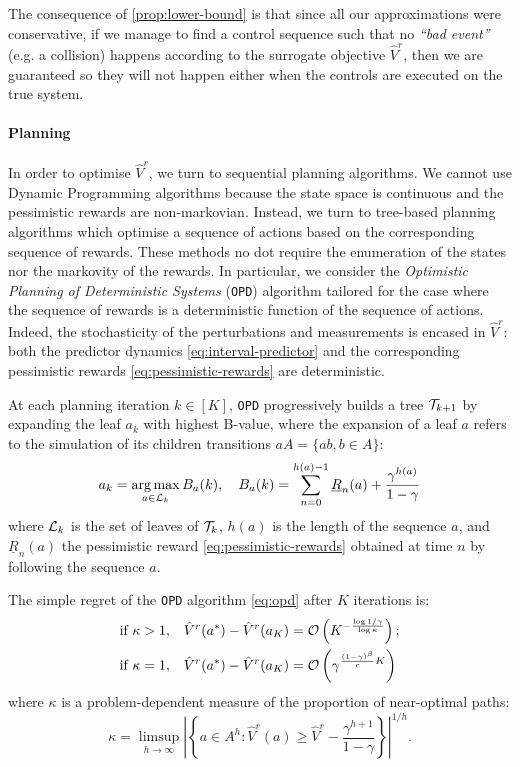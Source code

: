\documentclass{article}
\begin{document}
The consequence of \autoref{prop:lower-bound} is that since all our approximations were conservative, if we manage to find a control sequence such that no \textit{``bad event''} (e.g. a collision) happens according to the surrogate objective $\hat{V}^r$, then we are guaranteed so they will not happen either when the controls are executed on the true system. 

\paragraph{Planning}
In order to optimise $\hat{V}^r$, we turn to sequential planning algorithms. We cannot use Dynamic Programming algorithms because the state space is continuous and the pessimistic rewards are non-markovian. Instead, we turn to tree-based planning algorithms which optimise a sequence of actions based on the corresponding sequence of rewards. These methods no dot require the enumeration of the states nor the markovity of the rewards. In particular, we consider the \emph{Optimistic Planning of Deterministic Systems} (\texttt{OPD}) algorithm \citep{Hren2008} tailored for the case where the sequence of rewards is a deterministic function of the sequence of actions. Indeed, the stochasticity of the perturbations and measurements is encased in $\hat{V}^r$: both the predictor dynamics \eqref{eq:interval-predictor} and the corresponding pessimistic rewards \eqref{eq:pessimistic-rewards} are deterministic.

At each planning iteration $k\in[K]$, \texttt{OPD} progressively builds a tree $\mathcal{T}_{k+1}$ by expanding the leaf $a_k$ with highest B-value, where the expansion of a leaf $a$ refers to the simulation of its children transitions $aA = \{ab, b\in A\}$:
\begin{equation}
\label{eq:opd}
a_k = \operatorname*{arg\,max}_{a\in\mathcal{L}_k} B_a(k), \quad B_a(k) = \sum_{n=0}^{h(a)-1} \underline{R}_n(a) + \frac{\gamma^{h(a)}}{1-\gamma}
\end{equation}
where $\mathcal{L}_k$ is the set of leaves of $\mathcal{T}_k$, $h(a)$ is the length of the sequence $a$, and $\underline{R}_n(a)$ the pessimistic reward \eqref{eq:pessimistic-rewards} obtained at time $n$ by following the sequence $a$.
\begin{theorem}
\label{theorem:opd-regret}
The simple regret of the \texttt{OPD} algorithm \eqref{eq:opd} after $K$ iterations is:
\begin{align*}
\text{if } \kappa>1,\quad& 
\hat{V}^r(a^*) - \hat{V}^r({a_K}) = \mathcal{O}\left(K^{-\frac{\log 1/\gamma}{\log \kappa}}\right);\\
\text{if }\kappa=1,\quad&
\hat{V}^r(a^*) - \hat{V}^r({a_K}) = \mathcal{O}\left(\gamma^{\frac{(1-\gamma)^\beta}{c}K}\right)
\end{align*}
where $\kappa$ is a problem-dependent measure of the proportion of near-optimal paths:
\[
\kappa = \limsup_{h\rightarrow\infty} \left|\left\{a\in A^h: \hat{V}^r(a)\geq \hat{V}^r - \frac{\gamma^{h+1}}{1-\gamma}\right\}\right|^{1/h}.
\]
\end{theorem}
\end{document}
